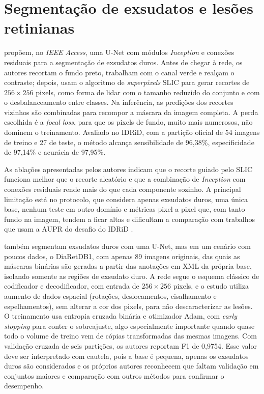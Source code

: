 \section{Segmentação de exsudatos e lesões retinianas}
\label{sec:rel-segmentacao}

 propõem, no \textit{IEEE Access}, uma U-Net com módulos \textit{Inception} e conexões residuais para a segmentação de exsudatos duros. Antes de chegar à rede, os autores recortam o fundo preto, trabalham com o canal verde e realçam o contraste; depois, usam o algoritmo de \textit{superpixels} SLIC para gerar recortes de $256 \times 256$ pixels, como forma de lidar com o tamanho reduzido do conjunto e com o desbalanceamento entre classes. Na inferência, as predições dos recortes vizinhos são combinadas para recompor a máscara da imagem completa. A perda escolhida é a \textit{focal loss}, para que os pixels de fundo, muito mais numerosos, não dominem o treinamento. Avaliado no IDRiD, com a partição oficial de 54 imagens de treino e 27 de teste, o método alcança sensibilidade de 96,38\%, especificidade de 97,14\% e acurácia de 97,95\%.

As ablações apresentadas pelos autores indicam que o recorte guiado pelo SLIC funciona melhor que o recorte aleatório e que a combinação de \textit{Inception} com conexões residuais rende mais do que cada componente sozinho. A principal limitação está no protocolo, que considera apenas exsudatos duros, uma única base, nenhum teste em outro domínio e métricas pixel a pixel que, com tanto fundo na imagem, tendem a ficar altas e dificultam a comparação com trabalhos que usam a AUPR do desafio do IDRiD \cite{porwal2020idrid}.

 também segmentam exsudatos duros com uma U-Net, mas em um cenário com poucos dados, o DiaRetDB1, com apenas 89 imagens originais, das quais as máscaras binárias são geradas a partir das anotações em XML da própria base, isolando somente as regiões de exsudato duro. A rede segue o esquema clássico de codificador e decodificador, com entrada de $256 \times 256$ pixels, e o estudo utiliza aumento de dados espacial (rotações, deslocamentos, cisalhamento e espelhamentos), sem alterar a cor dos pixels, para não descaracterizar as lesões. O treinamento usa entropia cruzada binária e otimizador Adam, com \textit{early stopping} para conter o sobreajuste, algo especialmente importante quando quase todo o volume de treino vem de cópias transformadas das mesmas imagens. Com validação cruzada de seis partições, os autores reportam F1 de 0,9754. Esse valor deve ser interpretado com cautela, pois a base é pequena, apenas os exsudatos duros são considerados e os próprios autores reconhecem que faltam validação em conjuntos maiores e comparação com outros métodos para confirmar o desempenho.

